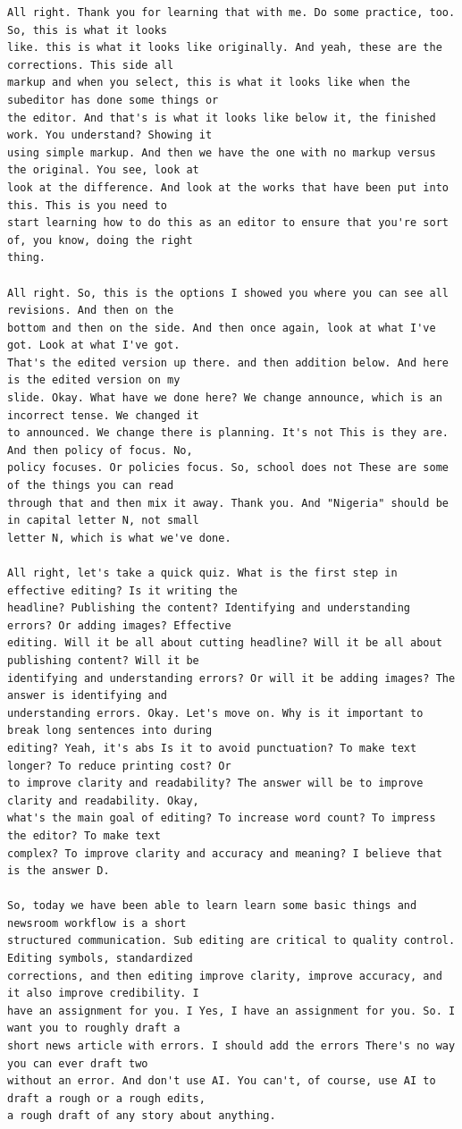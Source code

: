 {\begin{Verbatim}
All right. Thank you for learning that with me. Do some practice, too. So, this is what it looks
like. this is what it looks like originally. And yeah, these are the corrections. This side all
markup and when you select, this is what it looks like when the subeditor has done some things or
the editor. And that's is what it looks like below it, the finished work. You understand? Showing it
using simple markup. And then we have the one with no markup versus the original. You see, look at
look at the difference. And look at the works that have been put into this. This is you need to
start learning how to do this as an editor to ensure that you're sort of, you know, doing the right
thing.

All right. So, this is the options I showed you where you can see all revisions. And then on the
bottom and then on the side. And then once again, look at what I've got. Look at what I've got.
That's the edited version up there. and then addition below. And here is the edited version on my
slide. Okay. What have we done here? We change announce, which is an incorrect tense. We changed it
to announced. We change there is planning. It's not This is they are. And then policy of focus. No,
policy focuses. Or policies focus. So, school does not These are some of the things you can read
through that and then mix it away. Thank you. And "Nigeria" should be in capital letter N, not small
letter N, which is what we've done.

All right, let's take a quick quiz. What is the first step in effective editing? Is it writing the
headline? Publishing the content? Identifying and understanding errors? Or adding images? Effective
editing. Will it be all about cutting headline? Will it be all about publishing content? Will it be
identifying and understanding errors? Or will it be adding images? The answer is identifying and
understanding errors. Okay. Let's move on. Why is it important to break long sentences into during
editing? Yeah, it's abs Is it to avoid punctuation? To make text longer? To reduce printing cost? Or
to improve clarity and readability? The answer will be to improve clarity and readability. Okay,
what's the main goal of editing? To increase word count? To impress the editor? To make text
complex? To improve clarity and accuracy and meaning? I believe that is the answer D.

So, today we have been able to learn learn some basic things and newsroom workflow is a short
structured communication. Sub editing are critical to quality control. Editing symbols, standardized
corrections, and then editing improve clarity, improve accuracy, and it also improve credibility. I
have an assignment for you. I Yes, I have an assignment for you. So. I want you to roughly draft a
short news article with errors. I should add the errors There's no way you can ever draft two
without an error. And don't use AI. You can't, of course, use AI to draft a rough or a rough edits,
a rough draft of any story about anything.


\end{Verbatim}}

